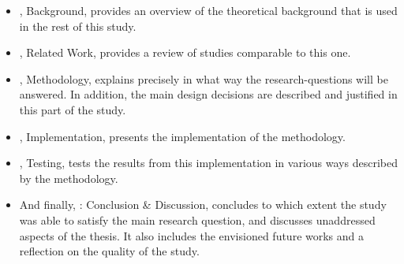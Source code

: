 \begin{itemize}[ ]
  \item {}, Background, provides an overview of the theoretical background that is used in the rest of this study.
  
  \item {}, Related Work, provides a review of studies comparable to this one.

  \item {}, Methodology, explains precisely in what way the research-questions will be answered.
  In addition, the main design decisions are described and justified in this part of the study.

  \item {}, Implementation, presents the implementation of the methodology.
  
  \item {}, Testing, tests the results from this implementation in various ways described by the methodology.
  
  \item And finally, : Conclusion \& Discussion, concludes to which extent the study was able to satisfy the main research question, and discusses unaddressed aspects of the thesis.
  It also includes the envisioned future works and a reflection on the quality of the study.

\end{itemize}